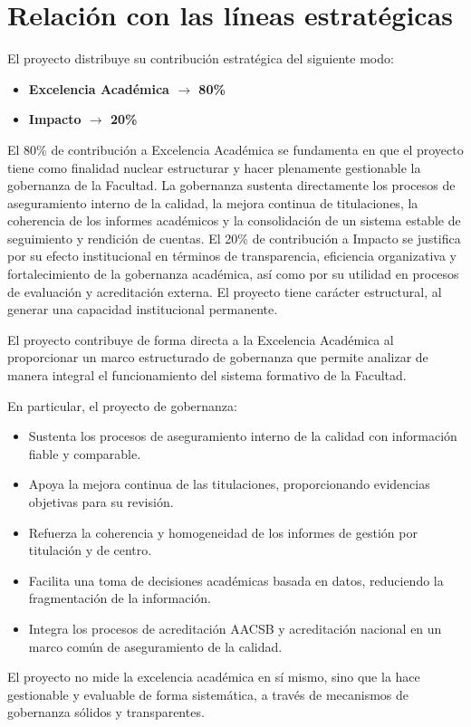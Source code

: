 \documentclass[11pt,a4paper]{scrreprt}
\begin{document}
\section{Relación con las líneas estratégicas}

El proyecto distribuye su contribución estratégica del siguiente modo: 

\begin{itemize}[noitemsep,topsep=2pt]
\item \textbf{Excelencia Académica $\rightarrow$ 80\%}
\item \textbf{Impacto $\rightarrow$ 20\%}
\end{itemize}

El 80\% de contribución a Excelencia Académica se fundamenta en que el proyecto tiene como finalidad nuclear estructurar y hacer plenamente gestionable la gobernanza de la Facultad. La gobernanza sustenta directamente los procesos de aseguramiento interno de la calidad, la mejora continua de titulaciones, la coherencia de los informes académicos y la consolidación de un sistema estable de seguimiento y rendición de cuentas. El 20\% de contribución a Impacto se justifica por su efecto institucional en términos de transparencia, eficiencia organizativa y fortalecimiento de la gobernanza académica, así como por su utilidad en procesos de evaluación y acreditación externa. El proyecto tiene carácter estructural, al generar una capacidad institucional permanente. 

El proyecto contribuye de forma directa a la Excelencia Académica al proporcionar un marco estructurado de gobernanza que permite analizar de manera integral el funcionamiento del sistema formativo de la Facultad. 

En particular, el proyecto de gobernanza: 

\begin{itemize}[noitemsep,topsep=2pt]
\item Sustenta los procesos de aseguramiento interno de la calidad con información fiable y comparable. 

\item Apoya la mejora continua de las titulaciones, proporcionando evidencias objetivas para su revisión. 

\item Refuerza la coherencia y homogeneidad de los informes de gestión por titulación y de centro. 

\item Facilita una toma de decisiones académicas basada en datos, reduciendo la fragmentación de la información. 

\item Integra los procesos de acreditación AACSB y acreditación nacional en un marco común de aseguramiento de la calidad. 
\end{itemize}
El proyecto no mide la excelencia académica en sí mismo, sino que la hace gestionable y evaluable de forma sistemática, a través de mecanismos de gobernanza sólidos y transparentes. 
\end{document}
